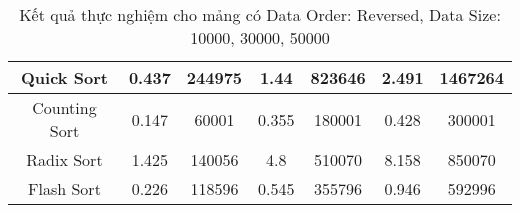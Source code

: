 \begin{table}[H]
{\begin{tabular}{|ccccccc|}
\multicolumn{1}{|c|}{Quick Sort} & \multicolumn{1}{c|}{0.437} & \multicolumn{1}{c|}{244975} & \multicolumn{1}{c|}{1.44} & \multicolumn{1}{c|}{823646} & \multicolumn{1}{c|}{2.491} & \multicolumn{1}{c|}{1467264} \\ \hline
\multicolumn{1}{|c|}{Counting Sort} & \multicolumn{1}{c|}{0.147} & \multicolumn{1}{c|}{60001} & \multicolumn{1}{c|}{0.355} & \multicolumn{1}{c|}{180001} & \multicolumn{1}{c|}{0.428} & \multicolumn{1}{c|}{300001} \\ \hline
\multicolumn{1}{|c|}{Radix Sort} & \multicolumn{1}{c|}{1.425} & \multicolumn{1}{c|}{140056} & \multicolumn{1}{c|}{4.8} & \multicolumn{1}{c|}{510070} & \multicolumn{1}{c|}{8.158} & \multicolumn{1}{c|}{850070} \\ \hline
\multicolumn{1}{|c|}{Flash Sort} & \multicolumn{1}{c|}{0.226} & \multicolumn{1}{c|}{118596} & \multicolumn{1}{c|}{0.545} & \multicolumn{1}{c|}{355796} & \multicolumn{1}{c|}{0.946} & \multicolumn{1}{c|}{592996} \\ \hline
\end{tabular}%
}
\caption{Kết quả thực nghiệm cho mảng có Data Order: Reversed, Data Size: 10000, 30000, 50000}
\label{tab:reversed_10000_30000_50000}
\end{table}

